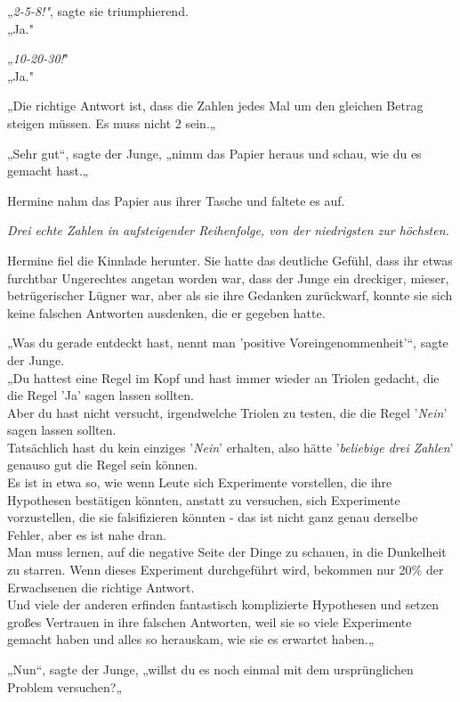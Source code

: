 {„\emph{2-5-8!"}, sagte sie triumphierend.\\ „Ja."

„\emph{10-20-30!}"\\ „Ja."

„Die richtige Antwort ist, dass die Zahlen jedes Mal um den gleichen Betrag steigen müssen. Es muss nicht 2 sein.„

„Sehr gut“, sagte der Junge, „nimm das Papier heraus und schau, wie du es gemacht hast.„

Hermine nahm das Papier aus ihrer Tasche und faltete es auf.

\emph{Drei echte Zahlen in aufsteigender Reihenfolge, von der niedrigsten zur höchsten.}

Hermine fiel die Kinnlade herunter. Sie hatte das deutliche Gefühl, dass ihr etwas furchtbar Ungerechtes angetan worden war, dass der Junge ein dreckiger, mieser, betrügerischer Lügner war, aber als sie ihre Gedanken zurückwarf, konnte sie sich keine falschen Antworten ausdenken, die er gegeben hatte.

„Was du gerade entdeckt hast, nennt man 'positive Voreingenommenheit'“, sagte der Junge.\\ „Du hattest eine Regel im Kopf und hast immer wieder an Triolen gedacht, die die Regel 'Ja' sagen lassen sollten.\\ Aber du hast nicht versucht, irgendwelche Triolen zu testen, die die Regel '\emph{Nein}' sagen lassen sollten.\\ Tatsächlich hast du kein einziges '\emph{Nein}' erhalten, also hätte '\emph{beliebige drei Zahlen}' genauso gut die Regel sein können.\\ Es ist in etwa so, wie wenn Leute sich Experimente vorstellen, die ihre Hypothesen bestätigen könnten, anstatt zu versuchen, sich Experimente vorzustellen, die sie falsifizieren könnten - das ist nicht ganz genau derselbe Fehler, aber es ist nahe dran.\\ Man muss lernen, auf die negative Seite der Dinge zu schauen, in die Dunkelheit zu starren. Wenn dieses Experiment durchgeführt wird, bekommen nur 20\% der Erwachsenen die richtige Antwort.\\ Und viele der anderen erfinden fantastisch komplizierte Hypothesen und setzen großes Vertrauen in ihre falschen Antworten, weil sie so viele Experimente gemacht haben und alles so herauskam, wie sie es erwartet haben.„

„Nun“, sagte der Junge, „willst du es noch einmal mit dem ursprünglichen Problem versuchen?„

}
